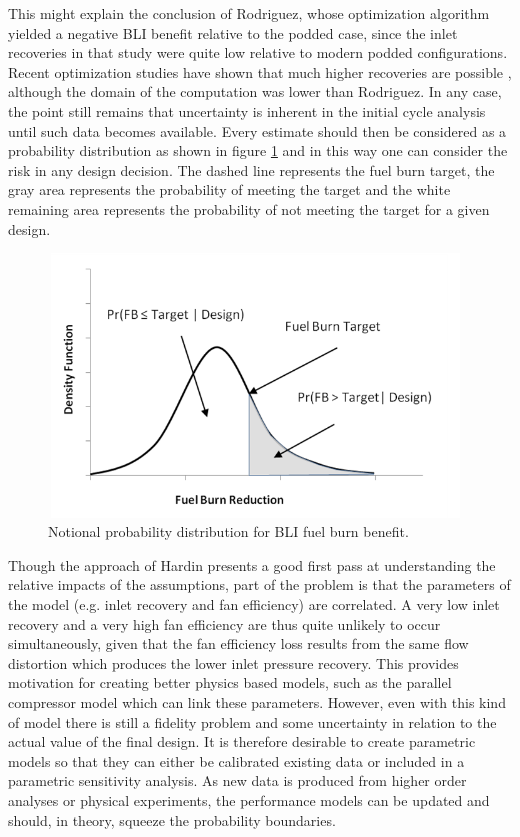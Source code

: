 \documentclass[12pt]{gatech-thesis}
\begin{document}
This might explain the conclusion of Rodriguez, whose optimization algorithm yielded a negative BLI benefit relative to the podded case, since the inlet recoveries in that study were quite low relative to modern podded configurations.  Recent optimization studies have shown that much higher recoveries are possible \cite{Liou2012} \cite{Florea2012}, although the domain of the computation was lower than Rodriguez.  In any case, the point still remains that uncertainty is inherent in the initial cycle analysis until such data becomes available.  Every estimate should then be considered as a probability distribution as shown in figure \ref{density_function} and in this way one can consider the risk in any design decision.  The dashed line represents the fuel burn target, the gray area represents the probability of meeting the target and the white remaining area represents the probability of not meeting the target for a given design.
	\begin{figure}[htpb]
	\centering
	\includegraphics[width=110mm, height =70mm, clip=true, trim = 1mm 1mm 1mm 1mm]{Fuel_Burn_PDF.png}
	\caption{Notional probability distribution for BLI fuel burn benefit.}
	\label{density_function}
	\end{figure}

\indent Though the approach of Hardin presents a good first pass at understanding the relative impacts of the assumptions, part of the problem is that the parameters of the model (e.g. inlet recovery and fan efficiency) are correlated.  A very low inlet recovery and a very high fan efficiency are thus quite unlikely to occur simultaneously, given that the fan efficiency loss results from the same flow distortion which produces the lower inlet pressure recovery.  This provides motivation for creating better physics based models, such as the parallel compressor model which can link these parameters.  However, even with this kind of model there is still a fidelity problem and some uncertainty in relation to the actual value of the final design.  It is therefore desirable to create parametric models so that they can either be calibrated existing data or included in a parametric sensitivity analysis.  As new data is produced from higher order analyses or physical experiments, the performance models can be updated and should, in theory, squeeze the probability boundaries.  
\end{document}

